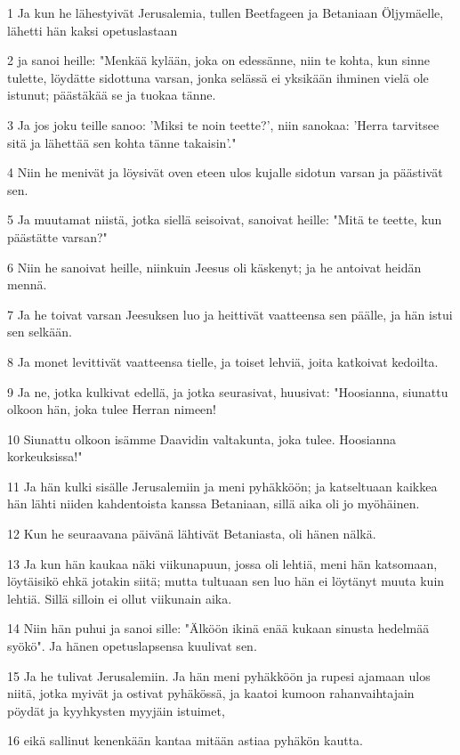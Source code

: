 \par 1 Ja kun he lähestyivät Jerusalemia, tullen Beetfageen ja Betaniaan Öljymäelle, lähetti hän kaksi opetuslastaan
\par 2 ja sanoi heille: "Menkää kylään, joka on edessänne, niin te kohta, kun sinne tulette, löydätte sidottuna varsan, jonka selässä ei yksikään ihminen vielä ole istunut; päästäkää se ja tuokaa tänne.
\par 3 Ja jos joku teille sanoo: 'Miksi te noin teette?', niin sanokaa: 'Herra tarvitsee sitä ja lähettää sen kohta tänne takaisin'."
\par 4 Niin he menivät ja löysivät oven eteen ulos kujalle sidotun varsan ja päästivät sen.
\par 5 Ja muutamat niistä, jotka siellä seisoivat, sanoivat heille: "Mitä te teette, kun päästätte varsan?"
\par 6 Niin he sanoivat heille, niinkuin Jeesus oli käskenyt; ja he antoivat heidän mennä.
\par 7 Ja he toivat varsan Jeesuksen luo ja heittivät vaatteensa sen päälle, ja hän istui sen selkään.
\par 8 Ja monet levittivät vaatteensa tielle, ja toiset lehviä, joita katkoivat kedoilta.
\par 9 Ja ne, jotka kulkivat edellä, ja jotka seurasivat, huusivat: "Hoosianna, siunattu olkoon hän, joka tulee Herran nimeen!
\par 10 Siunattu olkoon isämme Daavidin valtakunta, joka tulee. Hoosianna korkeuksissa!"
\par 11 Ja hän kulki sisälle Jerusalemiin ja meni pyhäkköön; ja katseltuaan kaikkea hän lähti niiden kahdentoista kanssa Betaniaan, sillä aika oli jo myöhäinen.
\par 12 Kun he seuraavana päivänä lähtivät Betaniasta, oli hänen nälkä.
\par 13 Ja kun hän kaukaa näki viikunapuun, jossa oli lehtiä, meni hän katsomaan, löytäisikö ehkä jotakin siitä; mutta tultuaan sen luo hän ei löytänyt muuta kuin lehtiä. Sillä silloin ei ollut viikunain aika.
\par 14 Niin hän puhui ja sanoi sille: "Älköön ikinä enää kukaan sinusta hedelmää syökö". Ja hänen opetuslapsensa kuulivat sen.
\par 15 Ja he tulivat Jerusalemiin. Ja hän meni pyhäkköön ja rupesi ajamaan ulos niitä, jotka myivät ja ostivat pyhäkössä, ja kaatoi kumoon rahanvaihtajain pöydät ja kyyhkysten myyjäin istuimet,
\par 16 eikä sallinut kenenkään kantaa mitään astiaa pyhäkön kautta.
